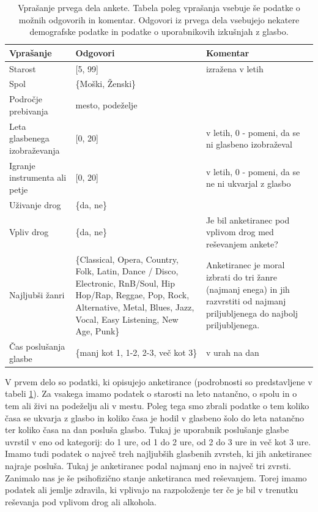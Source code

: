 \documentclass[a4paper, 12pt]{book}
\begin{document}
{\begin{table}[!hbt]
\begin{center}
\caption{Vprašanje prvega dela ankete. Tabela poleg vprašanja vsebuje še podatke o možnih odgovorih in komentar. Odgovori iz prvega dela vsebujejo nekatere demografske podatke in podatke o uporabnikovih izkušnjah z glasbo.}
\begin{tabular}{| p{3.5cm} | p{4.5cm} | p{4.5cm} |}
\hline
Vprašanje & Odgovori & Komentar \\ \hline \hline
Starost & [5, 99] & izražena v letih \\ \hline
Spol & \{Moški, Ženski\} & \\ \hline
Področje prebivanja & {mesto, podeželje} & \\ \hline
Leta glasbenega izobraževanja & [0, 20] & v letih, 0 - pomeni, da se ni glasbeno izobraževal \\ \hline
Igranje instrumenta ali petje & [0, 20] & v letih, 0 - pomeni, da se ne ni ukvarjal z glasbo \\ \hline
Uživanje drog & \{da, ne\} & \\ \hline
Vpliv drog & \{da, ne\} &  Je bil anketiranec pod vplivom drog med reševanjem ankete? \\ \hline
Najljubši žanri & \{Classical, Opera, Country, Folk, Latin, Dance / Disco, Electronic, RnB/Soul, Hip Hop/Rap, Reggae, Pop, Rock, Alternative, Metal, Blues, Jazz, Vocal, Easy Listening, New Age, Punk\} & Anketiranec je moral izbrati do tri žanre (najmanj enega) in jih razvrstiti od najmanj priljubljenega do najbolj priljubljenega. \\ \hline
Čas poslušanja glasbe & \{manj kot 1, 1-2, 2-3, več kot 3\} & v urah na dan \\ \hline

\end{tabular}
\label{prvidel}
\end{center}
\end{table} 


V prvem delo so podatki, ki opisujejo anketirance (podrobnosti so predstavljene v tabeli \ref{prvidel}). Za vsakega imamo podatek o starosti na leto natančno, o spolu in o tem ali živi na podeželju ali v mestu. Poleg tega smo zbrali podatke o tem koliko časa se ukvarja z glasbo in koliko časa je hodil v glasbeno šolo do leta natančno ter koliko časa na dan posluša glasbo. Tukaj je uporabnik poslušanje glasbe uvrstil v eno od kategorij: do 1 ure, od 1 do 2 ure, od 2 do 3 ure in več kot 3 ure. Imamo tudi podatek o največ treh najljubših glasbenih zvrsteh, ki jih anketiranec najraje posluša. Tukaj je anketiranec podal najmanj eno in največ tri zvrsti. Zanimalo nas je še psihofizično stanje anketiranca med reševanjem. Torej imamo podatek ali jemlje zdravila, ki vplivajo na razpoloženje ter če je bil v trenutku reševanja pod vplivom drog ali alkohola. 

}
\end{document}
